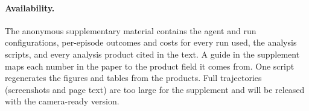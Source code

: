 \paragraph{Availability.} The anonymous supplementary material contains the agent and run configurations, per-episode outcomes and costs for every run used, the analysis scripts, and every analysis product cited in the text. A guide in the supplement maps each number in the paper to the product field it comes from. One script regenerates the figures and tables from the products. Full trajectories (screenshots and page text) are too large for the supplement and will be released with the camera-ready version.

